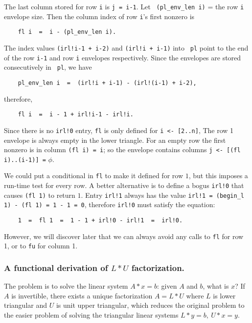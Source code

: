 The last column stored for row {\tt i} is {\tt j = i-1}.  Let {\tt
(pl\_env\_len i)} = the row {\tt i} envelope size.  Then the column
index of row {\tt i}'s first nonzero is
\begin{verbatim}
    fl i  =  i - (pl_env_len i).
\end{verbatim}
The index values {\tt (irl!i-1 + i-2)} and {\tt (irl!i + i-1)} into {\tt
pl} point to the end of the row {\tt i-1} and row {\tt i} envelopes
respectively.  Since the envelopes are stored consecutively in {\tt
pl}, we have
\begin{verbatim}
    pl_env_len i  =  (irl!i + i-1) - (irl!(i-1) + i-2),
\end{verbatim}
therefore,
\begin{verbatim}
    fl i  =  i - 1 + irl!i-1 - irl!i.
\end{verbatim}

Since there is no {\tt irl!0} entry, {\tt fl} is only defined for
{\tt i <- [2..n]},   The row 1 envelope is always empty in the lower
triangle.  For an empty row the first nonzero is in column {\tt (fl i) =  
i};
so the envelope contains columns {\tt j <- [(fl i)..(i-1)] =} $\phi$.

We could put a conditional in {\tt fl} to make it defined for row $1$,
but this imposes a run-time test for every row.  A better alternative
is to define a bogus {\tt irl!0} that causes {\tt (fl 1)} to return $1$.
Entry {\tt irl!1} always has the value
{\tt irl!1 = (begin\_l 1) - (fl 1) = 1 - 1 = 0},
therefore {\tt irl!0} must satisfy the equation:
\begin{verbatim}
    1  =  fl 1  =  1 - 1 + irl!0 - irl!1  =  irl!0.
\end{verbatim}
However, we will discover later that we can always avoid any calls to
{\tt fl} for row 1, or to {\tt fu} for column 1.


\subsubsection{A functional derivation of $L*U$ factorization.}

The problem is to solve the linear system $A*x = b$: given $A$
and $b$, what is $x$?  If $A$ is invertible, there exists
a unique factorization $A = L*U$ where $L$ is lower triangular
and $U$ is unit upper triangular, which reduces the original
problem to the easier problem of solving the triangular linear systems
$L*y = b,\ U*x = y$.

